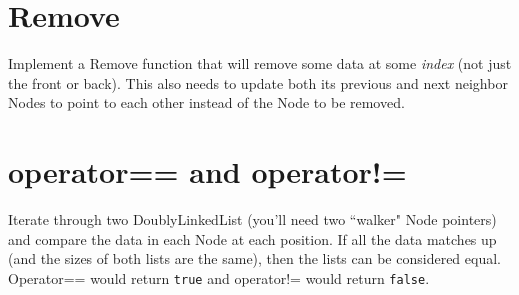 \documentclass[a4paper,12pt,oneside]{book}
\begin{document}
    \section{Remove}
    
        Implement a Remove function that will remove some data at
        some \textit{index} (not just the front or back).
        This also needs to update both its previous and next neighbor
        Nodes to point to each other instead of the Node to be removed.
    
    \section{operator== and operator!=}
    
        Iterate through two DoublyLinkedList (you'll need two ``walker"
        Node pointers) and compare the data in each Node at each position.
        If all the data matches up (and the sizes of both lists are the same),
        then the lists can be considered equal. Operator== would return
        \texttt{true} and operator!= would return \texttt{false}.
\end{document}
